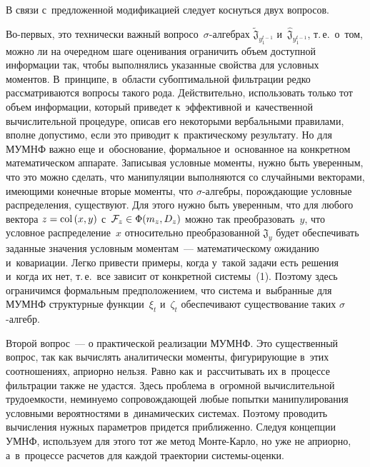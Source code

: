 \begin{multicols}{2}
    В связи с~предложенной модификацией следует коснуться двух вопросов. 

Во-первых, это технически важный вопрос\linebreak о~$\sigma$-ал\-геб\-рах 
$\tilde{\mathfrak{J}}_{y_1^{t-1}}$ и~$\hat{\mathfrak{J}}_{y_1^{t-1}}$, т.\,е.\ 
о~том, можно ли на очередном шаге оценивания ограничить объем доступной 
информации так, чтобы выполнялись указан\-ные свойства для условных 
моментов. В~принципе, в~области субоптимальной фильтрации редко 
рассматриваются вопросы такого рода. Действительно, использовать только тот 
объем информации, который приведет к~эффективной и~качественной 
вычислительной процедуре, описав его некоторыми вербальными правилами, 
вполне допустимо, если это приводит к~практическому результату. Но для 
МУМНФ важно еще и~обоснование, формальное и~основанное на конкретном 
математическом аппарате. Записывая условные моменты, нужно быть 
уверенным, что это можно сделать, что манипуляции выполняются со 
случайными векторами, имеющими конечные вторые моменты, что  
$\sigma$-ал\-геб\-ры, порождающие условные распределения, существуют. Для 
этого нужно быть уверенным, что для любого вектора $z\hm= \mathrm{col}\, (x,y)$ 
с~$\mathcal{F}_z\hm\in \Phi(m_z, D_z)$ можно так преобразовать~$y$, что 
условное распределение~$x$ относительно преобразованной $\mathfrak{J}_y$ 
будет обеспечивать заданные значения условным моментам~--- 
математическому ожиданию и~ковариации. Легко привести примеры, когда 
у~такой задачи есть решения и~когда их нет, т.\,е.\ все зависит от конкретной 
системы~(1). Поэтому здесь ограничимся формальным предположением, что 
система и~выбранные для МУМНФ структурные функции~$\xi_t$ и~$\zeta_t$ 
обеспечивают существование таких $\sigma$-ал\-гебр.
    
    Второй вопрос~--- о практической реализации 
МУМНФ. Это существенный вопрос, так как вычислять аналитически моменты, 
фигурирующие в~этих соотношениях, априорно нель\-зя. Равно как 
и~рассчитывать их в~процессе фильт\-ра\-ции также не удастся. Здесь проблема 
в~огромной вычислительной трудоемкости, неминуемо со\-про\-вож\-да\-ющей 
любые попытки манипулирования условными вероятностями в~динамических 
системах. Поэтому проводить вычисления нужных параметров придется 
приближенно. Следуя концепции УМНФ, используем для этого тот же метод 
Мон\-те-Кар\-ло, но уже не априорно, а~в~процессе расчетов для каждой 
траектории сис\-те\-мы-оценки.
    

\end{multicols}
